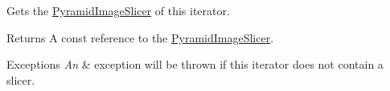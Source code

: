 Gets the \hyperlink{classdg_1_1deepcore_1_1imagery_1_1_pyramid_image_slicer}{Pyramid\+Image\+Slicer} of this iterator. 

\begin{DoxyReturn}{Returns}
A const reference to the \hyperlink{classdg_1_1deepcore_1_1imagery_1_1_pyramid_image_slicer}{Pyramid\+Image\+Slicer}. 
\end{DoxyReturn}

\begin{DoxyExceptions}{Exceptions}
{\em An} & exception will be thrown if this iterator does not contain a slicer. \\
\hline
\end{DoxyExceptions}
